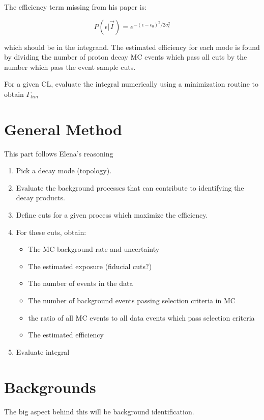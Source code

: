 \documentclass[journal, a4paper]{IEEEtran}
\begin{document}
	The efficiency term missing from his paper is:
	
	\begin{equation}
		P(\epsilon| \vec I) = e^{-(\epsilon-\epsilon_0)^2/2\sigma_{\epsilon}^2}
	\end{equation}
	
	which should be in the integrand.
	The estimated efficiency for each mode is found by dividing the number of proton decay MC events which pass all cuts by the number which pass the event sample cuts.
	
	For a given CL, evaluate the integral numerically using a minimization routine to obtain $\Gamma_{lim}$
	
	\section{General Method}
	
	This part follows Elena's reasoning
	
	\begin{enumerate}
		\item Pick a decay mode (topology).
		\item Evaluate the background processes that can contribute to identifying the decay products.
		\item Define cuts for a given process which maximize the efficiency.
		\item For these cuts, obtain:
			\begin{itemize}
				\item The MC background rate and uncertainty
				\item The estimated exposure (fiducial cuts?)
				\item The number of events in the data
				\item The number of background events passing selection criteria in MC
				\item the ratio of all MC events to all data events which pass selection criteria
				\item The estimated efficiency
			\end{itemize} 
		\item Evaluate integral
	\end{enumerate}
	
	\section{Backgrounds}

		The big aspect behind this will be background identification.
		
\end{document}
